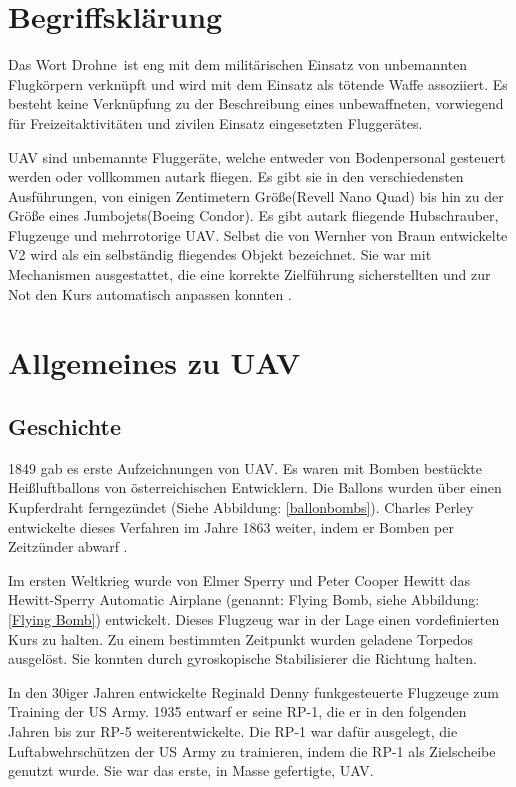 \section{Begriffsklärung}
Das Wort \glqq Drohne\grqq\ ist eng mit dem militärischen Einsatz von unbemannten Flugkörpern verknüpft und wird mit dem Einsatz als tötende Waffe assoziiert. Es besteht keine Verknüpfung zu der Beschreibung eines unbewaffneten, vorwiegend für Freizeitaktivitäten und zivilen Einsatz eingesetzten Fluggerätes\cite{Buch_Engl}.


\ac{UAV} sind unbemannte Fluggeräte, welche entweder von Bodenpersonal gesteuert werden oder vollkommen autark fliegen. Es gibt sie in den verschiedensten Ausführungen, von einigen Zentimetern Größe(Revell Nano Quad) bis hin zu der Größe eines Jumbojets(Boeing Condor). Es gibt autark fliegende Hubschrauber, Flugzeuge und mehrrotorige \ac{UAV}. Selbst die von Wernher von Braun entwickelte \ac{V2} wird als ein selbständig fliegendes Objekt bezeichnet. Sie war  mit Mechanismen ausgestattet, die eine korrekte Zielführung sicherstellten und zur Not den Kurs automatisch anpassen konnten \cite{V2}.

\section{Allgemeines zu \acs{UAV}}
\subsection{Geschichte}

1849 gab es erste Aufzeichnungen von \ac{UAV}. Es waren mit Bomben bestückte Heißluftballons von österreichischen Entwicklern. Die Ballons wurden über einen Kupferdraht ferngezündet (Siehe Abbildung:   \ref{ballonbombs}). Charles Perley entwickelte dieses Verfahren im Jahre 1863 weiter, indem er Bomben per Zeitzünder abwarf \cite{baloonbombs}.

Im ersten Weltkrieg wurde von Elmer Sperry und Peter Cooper Hewitt das  Hewitt-Sperry Automatic Airplane (genannt: Flying Bomb, siehe Abbildung: \ref{Flying Bomb}) entwickelt. Dieses Flugzeug war in der Lage einen vordefinierten Kurs zu halten.
Zu einem bestimmten Zeitpunkt wurden geladene Torpedos ausgelöst. Sie konnten durch gyroskopische Stabilisierer die Richtung halten.\cite{flyingbomb}

In den 30iger Jahren entwickelte Reginald Denny funkgesteuerte Flugzeuge zum Training der US Army. 1935 entwarf er seine \ac{RP-1}, die er in den folgenden Jahren bis zur RP-5 weiterentwickelte. Die \ac{RP-1} war dafür ausgelegt, die Luftabwehrschützen der US Army zu trainieren, indem die \ac{RP-1} als Zielscheibe genutzt wurde. Sie war das erste, in Masse gefertigte, \ac{UAV}.\cite{RP-1}

